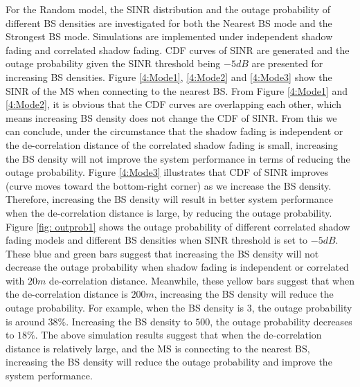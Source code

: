  \par For the Random model, the SINR distribution and the outage probability of different BS densities are investigated for both the Nearest BS mode and the Strongest BS mode. Simulations are implemented under independent shadow fading and correlated shadow fading. CDF curves of SINR are generated and the outage probability given the SINR threshold being $-5dB$ are presented for increasing BS densities. Figure \ref{4:Mode1}, \ref{4:Mode2} and \ref{4:Mode3} show the SINR of the MS when connecting to the nearest BS. From Figure \ref{4:Mode1} and \ref{4:Mode2}, it is obvious that the CDF curves are overlapping each other, which means increasing BS density does not change the CDF of SINR. From this we can conclude, under the circumstance that the shadow fading is independent or the de-correlation distance of the correlated shadow fading is small, increasing the BS density will not improve the system performance in terms of reducing the outage probability. Figure \ref{4:Mode3}  illustrates that CDF of SINR improves (curve moves toward the bottom-right corner) as we increase the BS density. Therefore, increasing the BS density will result in better system performance when the de-correlation distance is large, by reducing the outage probability. Figure \ref{fig: outprob1} shows the outage probability of different correlated shadow fading models and different BS densities when SINR threshold is set to $-5dB$. These blue and green bars suggest that increasing the BS density will not decrease the outage probability when shadow fading is independent or correlated with $20m$ de-correlation distance. Meanwhile, these yellow bars suggest that when the de-correlation distance is $200m$, increasing the BS density will reduce the outage probability. For example, when the BS density is $3$, the outage probability is around $38\%$. Increasing the BS density to $500$, the outage probability decreases to $18\%$. The above simulation results suggest that when the de-correlation distance is relatively large, and the MS is connecting to the nearest BS, increasing the BS density will reduce the outage probability and improve the system performance.



